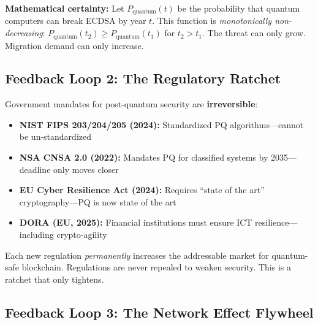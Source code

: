 \documentclass[11pt,a4paper]{article}
\begin{document}
\textbf{Mathematical certainty:} Let $P_{\text{quantum}}(t)$ be the probability that quantum computers can break ECDSA by year $t$. This function is \textit{monotonically non-decreasing}: $P_{\text{quantum}}(t_2) \geq P_{\text{quantum}}(t_1)$ for $t_2 > t_1$. The threat can only grow. Migration demand can only increase.

\subsection{Feedback Loop 2: The Regulatory Ratchet}

Government mandates for post-quantum security are \textbf{irreversible}:

\begin{itemize}[leftmargin=1.5em]
    \item \textbf{NIST FIPS 203/204/205 (2024):} Standardized PQ algorithms---cannot be un-standardized
    \item \textbf{NSA CNSA 2.0 (2022):} Mandates PQ for classified systems by 2035---deadline only moves closer
    \item \textbf{EU Cyber Resilience Act (2024):} Requires ``state of the art'' cryptography---PQ is now state of the art
    \item \textbf{DORA (EU, 2025):} Financial institutions must ensure ICT resilience---including crypto-agility
\end{itemize}

Each new regulation \textit{permanently} increases the addressable market for quantum-safe blockchain. Regulations are never repealed to weaken security. This is a ratchet that only tightens.

\subsection{Feedback Loop 3: The Network Effect Flywheel}
\end{document}

